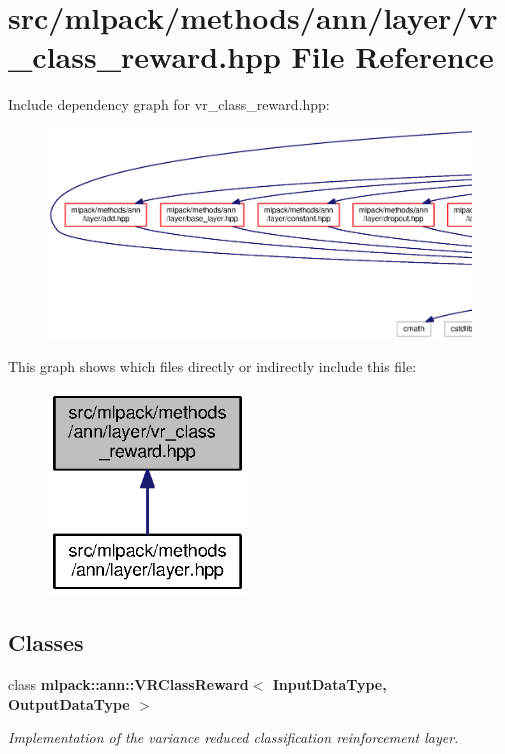 \section{src/mlpack/methods/ann/layer/vr\+\_\+class\+\_\+reward.hpp File Reference}
\label{vr__class__reward_8hpp}
Include dependency graph for vr\+\_\+class\+\_\+reward.\+hpp\+:
\nopagebreak
\begin{figure}[H]
\begin{center}
\leavevmode
\includegraphics[width=350pt]{vr__class__reward_8hpp__incl}
\end{center}
\end{figure}
This graph shows which files directly or indirectly include this file\+:
\nopagebreak
\begin{figure}[H]
\begin{center}
\leavevmode
\includegraphics[width=149pt]{vr__class__reward_8hpp__dep__incl}
\end{center}
\end{figure}
\subsection*{Classes}
\begin{DoxyCompactItemize}
\item 
class {\bf mlpack\+::ann\+::\+V\+R\+Class\+Reward$<$ Input\+Data\+Type, Output\+Data\+Type $>$}
\begin{DoxyCompactList}\small\item\em Implementation of the variance reduced classification reinforcement layer. \end{DoxyCompactList}\end{DoxyCompactItemize}
